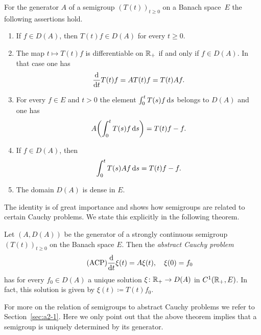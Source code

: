 \begin{proposition}\label{prop:a1-1.6}
For the generator $A$ of a semigroup $(T(t))_{t \geq 0}$ on a Banach space~$E$ the following assertions hold.
\begin{enumerate}[\upshape(i)]
\item
If\/ $f \in D(A)$, then $T(t)f \in D(A)$ for every $t \geq 0$.

\item
The map $t \mapsto T(t)f$ is differentiable on $\mathbb{R}_{+}$ if and only if\/ $f \in D(A)$.
In that case one has
\begin{equation}\label{eq:a1-1.2}
    \frac{\mathop{}\!\mathrm{d}{}}{\mathop{}\!\mathrm{d}{t}} T(t)f = AT(t)f = T(t)Af .
\end{equation}
\item
For every $f \in E$ and $t > 0$ the element $\int_0^t T(s)f \mathop{}\!\mathrm{d}{s}$ belongs to $D(A)$ and one has
\begin{equation}\label{eq:a1-1.3}
    A \mleft( \int_0^t T(s)f \ds \mright) = T(t)f - f  .
\end{equation}
\item
If\/ $f \in D(A)$, then
\begin{equation}\label{eq:a1-1.4}
    \int_0^t T(s)Af \mathop{}\!\mathrm{d}{s} = T(t)f - f  .
\end{equation}
\item
The domain $D(A)$ is dense in $E$.
\end{enumerate}
\end{proposition}
The identity  is of great importance and shows how semigroups are related to certain Cauchy problems.
We state this explicitly in the following theorem.
\begin{theorem}\label{thm:a1-1.7}
Let $(A,D(A))$ be the generator of a strongly continuous semigroup $(T(t))_{t \geq 0}$ on the Banach space $E$.
Then the \emph{abstract Cauchy problem}
\begin{equation}\label{eq:a1-1.5.ACP} \tag{ACP}
\frac{\mathop{}\!\mathrm{d}{}}{\mathop{}\!\mathrm{d}{t}}\xi(t) = A\xi(t), \quad \xi(0) = f_{0}
\end{equation}
has for every $f_{0} \in D(A)$ a unique solution $\xi \colon \mathbb{R}_{+} \to D(A)$ in $C^1(\mathbb{R}_{+},E)$.
In fact, this solution is given by $\xi(t) \coloneq T(t)f_{0}$.
\end{theorem}
For more on the relation of semigroups to abstract Cauchy problems we refer to Section~\ref{sec:a2-1}.
Here we only point out that the above theorem implies that a semigroup is uniquely determined by its generator.

